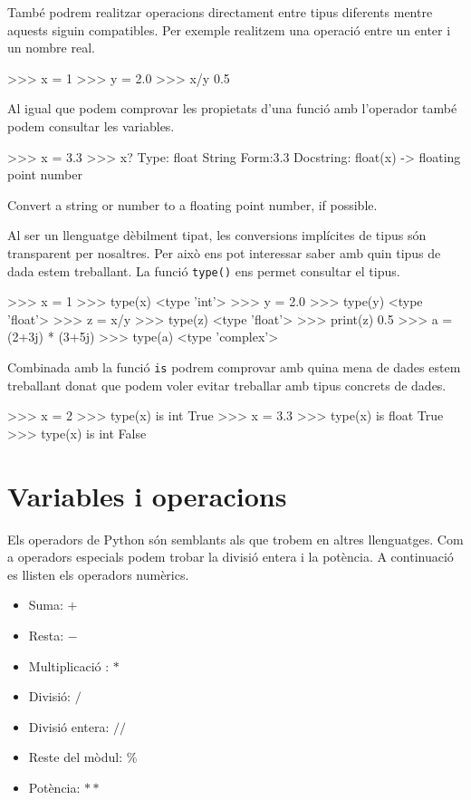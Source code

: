 També podrem realitzar operacions directament entre tipus diferents mentre aquests siguin compatibles. Per exemple realitzem una operació entre un enter i un nombre real.

\begin{tip}[caption=Conversió implícita de dades]
>>> x = 1
>>> y = 2.0
>>> x/y
0.5
\end{tip}


Al igual que podem comprovar les propietats d'una funció amb l'operador {\tt } també podem consultar les variables.

\begin{blockcode}
>>> x = 3.3
>>> x?
Type:       float
String Form:3.3
Docstring:
float(x) -> floating point number

Convert a string or number to a floating point number, if 
possible.
\end{blockcode}	


Al ser un llenguatge dèbilment tipat, les conversions implícites de tipus són transparent per nosaltres. Per això ens pot interessar saber amb quin tipus de dada estem treballant. La funció {\tt type()} ens permet consultar el tipus.


\begin{tip}[caption=La funció \emph{type}]
>>> x = 1
>>> type(x)
<type 'int'>
>>> y = 2.0
>>> type(y)
<type 'float'>
>>> z = x/y
>>> type(z)
<type 'float'>
>>> print(z)
0.5
>>> a = (2+3j) * (3+5j)
>>> type(a)
<type 'complex'>
\end{tip}

Combinada amb la funció {\tt is} podrem comprovar amb quina mena de dades estem treballant donat que podem voler evitar treballar amb tipus concrets de dades.

\begin{tip}[caption=Comprobació lógica de tipus]
>>> x = 2
>>> type(x) is int
True
>>> x = 3.3
>>> type(x) is float
True
>>> type(x) is int
False
\end{tip}


\section{Variables i operacions}

Els operadors de Python són semblants als que trobem en altres llenguatges. Com a operadors especials podem trobar la divisió entera i la potència. A continuació es llisten els operadors numèrics.

\begin{itemize}
	\item Suma: $+$
	\item Resta:  $-$
	\item Multiplicació : $*$
	\item Divisió: $/$
	\item Divisió entera: $//$
	\item Reste del mòdul: $\%$
	\item Potència: $**$
\end{itemize}

